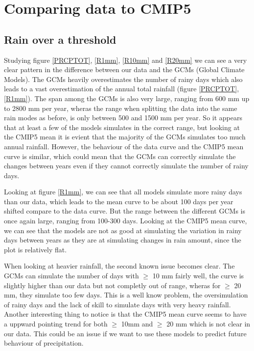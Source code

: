 \documentclass{article}
\begin{document}
\section{Comparing data to CMIP5}
\subsection{Rain over a threshold}
Studying figure \ref{PRCPTOT}, \ref{R1mm}, \ref{R10mm} and \ref{R20mm} we can see a very clear pattern in the difference between our data and the GCMs (Global Climate Models). The GCMs heavily overestimates the number of rainy days which also leads to a vast overestimation of the annual total rainfall (figure \ref{PRCPTOT}, \ref{R1mm}). The span among the GCMs is also very large, ranging from 600 mm up to 2800 mm per year, wheras the range when splitting the data into the same rain modes as before, is only between 500 and 1500 mm per year. So it appears that at least a few of the models simulates in the correct range, but looking at the CMIP5 mean it is evient that the majority of the GCMs simulates  too much annual rainfall. However, the behaviour of the data curve and the CMIP5 mean curve is similar, which could mean that the GCMs can correctly simulate the changes between years even if they cannot correctly simulate the number of rainy days.

Looking at figure \ref{R1mm}, we can see that all models simulate more rainy days than our data, which leads to the mean curve to be about 100 days per year shifted compare to the data curve. But the range between the different GCMs is once again large, ranging from 100-300 days. Looking at the CMIP5 mean curve, we can see that the models are not as good at simulating the variation in rainy days between years as they are at simulating changes in rain amount, since the plot is relatively flat. 

When looking at heavier rainfall, the second known issue becomes clear. The GCMs can simulate the number of days with $\geq$ 10 mm fairly well, the curve is slightly higher than our data but not completly out of range, wheras for $\geq$ 20 mm, they simulate too few days. This is a well know problem, the oversimulation of rainy days and the lack of skill to simulate days with very heavy rainfall. Another interesting thing to notice is that the CMIP5 mean curve seems to have a uppward pointing trend for both $\geq$ 10mm and $\geq$ 20 mm which is not clear in our data. This could be an issue if we want to use these models to predict future behaviour of precipitation. 
\end{document}
